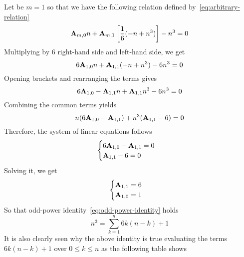 \begin{example}
    Let be $m=1$ so that we have the following relation defined by~\eqref{eq:arbitrary-relation}
    \begin{equation*}
        {\mathbf{A}} \sb{m,0} n + {\mathbf{A}} \sb{m,1} \left[ \frac{1}{6} (-n + n^3) \right] -n^3 = 0
    \end{equation*}
    Multiplying by $6$ right-hand side and left-hand side, we get
    \begin{equation*}
        6{\mathbf{A}} \sb{1,0} n + {\mathbf{A}} \sb{1,1} (-n + n^3) - 6n^3 = 0
    \end{equation*}
    Opening brackets and rearranging the terms gives
    \begin{equation*}
        6 {\mathbf{A}} \sb{1,0} - {\mathbf{A}} \sb{1,1} n + {\mathbf{A}} \sb{1,1} n^3 - 6n^3 = 0
    \end{equation*}
    Combining the common terms yields
    \begin{equation*}
        n(6{\mathbf{A}} \sb{1,0} - {\mathbf{A}} \sb{1,1}) + n^3 ({\mathbf{A}} \sb{1,1} - 6) = 0
    \end{equation*}
    Therefore, the system of linear equations follows
    \begin{equation*}
        \begin{cases}
            6 {\mathbf{A}} \sb{1,0} - {\mathbf{A}} \sb{1,1} = 0 \\
            {\mathbf{A}} \sb{1,1} - 6 = 0
        \end{cases}
    \end{equation*}
    Solving it, we get
    \begin{equation*}
        \begin{cases}
            {\mathbf{A}} \sb{1,1} = 6 \\
            {\mathbf{A}} \sb{1,0} = 1
        \end{cases}
    \end{equation*}
    So that odd-power identity~\eqref{eq:odd-power-identity} holds
    \begin{equation*}
        n^3 = \sum_{k=1}^{n} 6k(n-k) + 1
    \end{equation*}
    It is also clearly seen why the above identity is true evaluating the terms $6k(n-k) + 1$ over $0 \leq k \leq n$ as
    the following table shows
    
\end{example}
